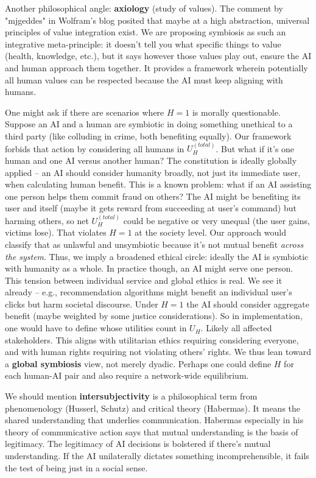 \documentclass[12pt]{article}
\begin{document}
Another philosophical angle: \textbf{axiology} (study of values). The comment by "mjgeddes" in Wolfram’s blog posited that maybe at a high abstraction, universal principles of value integration exist. We are proposing symbiosis as such an integrative meta-principle: it doesn’t tell you what specific things to value (health, knowledge, etc.), but it says however those values play out, ensure the AI and human approach them together. It provides a framework wherein potentially all human values can be respected because the AI must keep aligning with humans.

One might ask if there are scenarios where $H=1$ is morally questionable. Suppose an AI and a human are symbiotic in doing something unethical to a third party (like colluding in crime, both benefiting equally). Our framework forbids that action by considering all humans in $U_H^{(total)}$. But what if it’s one human and one AI versus another human? The constitution is ideally globally applied – an AI should consider humanity broadly, not just its immediate user, when calculating human benefit. This is a known problem: what if an AI assisting one person helps them commit fraud on others? The AI might be benefiting its user and itself (maybe it gets reward from succeeding at user’s command) but harming others, so net $U_H^{(total)}$ could be negative or very unequal (the user gains, victims lose). That violates $H=1$ at the society level. Our approach would classify that as unlawful and unsymbiotic because it’s not mutual benefit \emph{across the system}. Thus, we imply a broadened ethical circle: ideally the AI is symbiotic with humanity as a whole. In practice though, an AI might serve one person. This tension between individual service and global ethics is real. We see it already – e.g., recommendation algorithms might benefit an individual user’s clicks but harm societal discourse. Under $H=1$ the AI should consider aggregate benefit (maybe weighted by some justice considerations). So in implementation, one would have to define whose utilities count in $U_H$. Likely all affected stakeholders. This aligns with utilitarian ethics requiring considering everyone, and with human rights requiring not violating others’ rights. We thus lean toward a \textbf{global symbiosis} view, not merely dyadic. Perhaps one could define $H$ for each human-AI pair and also require a network-wide equilibrium.

We should mention \textbf{intersubjectivity} is a philosophical term from phenomenology (Husserl, Schutz) and critical theory (Habermas). It means the shared understanding that underlies communication. Habermas especially in his theory of communicative action says that mutual understanding is the basis of legitimacy. The legitimacy of AI decisions is bolstered if there’s mutual understanding. If the AI unilaterally dictates something incomprehensible, it fails the test of being just in a social sense. 
\end{document}
